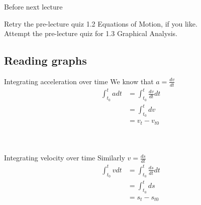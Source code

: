 \begin{frame}{Before next lecture}

Retry the pre-lecture quiz 1.2  Equations of Motion, if you like.\\[1ex]

Attempt the pre-lecture quiz for 1.3  Graphical Analysis.\\

\end{frame}



\subsection{Reading graphs }


\begin{frame}{Integrating acceleration over time}
\small
We know that $a = \frac{dv}{dt}$\\

\begin{equation}\nonumber
\begin{split}
\displaystyle \int_{t_0}^{t} a dt  & = \displaystyle\int_{t_0}^{t} \frac{dv}{dt} dt\\
  & = \displaystyle \int_{t_0}^{t} dv \\
  & = v_{t} - v_{t0} \\
\end{split}
\end{equation}

  \\[1ex]



\end{frame}


\begin{frame}{Integrating velocity over time}
\small
Similarly $v = \frac{ds}{dt}$\\

\begin{equation}\nonumber
\begin{split}
\displaystyle \int_{t_0}^{t} v dt  & = \displaystyle\int_{t_0}^{t} \frac{ds}{dt} dt\\
  & = \displaystyle \int_{t_0}^{t} ds \\
  & = s_{t} - s_{t0} \\
\end{split}
\end{equation}

  \\[1ex]

\end{frame}

